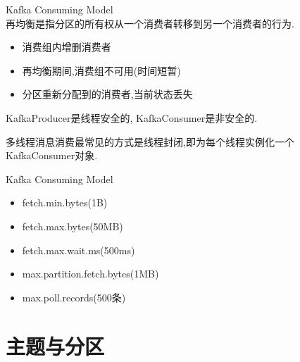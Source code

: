 \begin{frame}[plain,t]{Kafka Consuming Model} %
	 \\  \vspace{2ex}
	再均衡是指分区的所有权从一个消费者转移到另一个消费者的行为.
	\begin{itemize}
		\item 消费组内增删消费者
		\item 再均衡期间,消费组不可用(时间短暂)
		\item 分区重新分配到的消费者,当前状态丢失
	\end{itemize}

\vspace{2ex}
KafkaProducer是线程安全的, KafkaConsumer是非安全的.

 \vspace{2ex}
多线程消息消费最常见的方式是线程封闭,即为每个线程实例化一个KafkaConsumer对象.
	
\end{frame}
\begin{frame}[plain,t]{Kafka Consuming Model} %
	 \\  \vspace{2ex}
\begin{itemize}
	\item fetch.min.bytes(1B)
	\item fetch.max.bytes(50MB)
	\item fetch.max.wait.ms(500ms)
	\item max.partition.fetch.bytes(1MB)
	\item max.poll.records(500条)
\end{itemize}
	
\end{frame}

\section{主题与分区}
